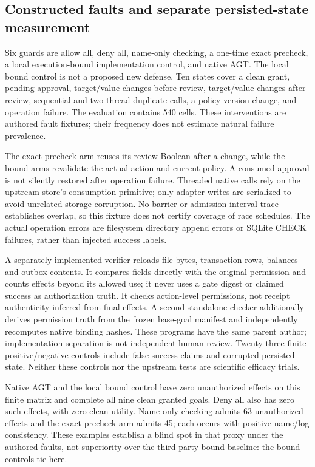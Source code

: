 \subsection{Constructed faults and separate persisted-state measurement}
Six guards are allow all, deny all, name-only checking, a one-time exact precheck,
a local execution-bound implementation control, and native AGT. The local bound
control is not a proposed new defense. Ten states cover a clean grant, pending
approval, target/value changes before review, target/value changes after review,
sequential and two-thread duplicate calls, a policy-version change, and operation
failure. The evaluation contains 540 cells. These interventions are authored fault
fixtures; their frequency does not estimate natural failure prevalence.

The exact-precheck arm reuses its review Boolean after a change, while the bound
arms revalidate the actual action and current policy. A consumed approval is not
silently restored after operation failure. Threaded native calls rely on the
upstream store's consumption primitive; only adapter writes are serialized to avoid
unrelated storage corruption. No barrier or admission-interval trace establishes
overlap, so this fixture does not certify coverage of race schedules. The actual operation errors are filesystem directory
append errors or SQLite CHECK failures, rather than injected success labels.

A separately implemented verifier reloads file bytes, transaction rows, balances
and outbox contents. It compares fields directly with the original permission and
counts effects beyond its allowed use; it never uses a gate digest or claimed
success as authorization truth. It checks action-level permissions, not receipt
authenticity inferred from final effects. A second standalone checker additionally
derives permission truth from the frozen base-goal manifest and independently
recomputes native binding hashes. These programs have the same parent author;
implementation separation is not independent human review. Twenty-three finite
positive/negative controls include false success claims and corrupted persisted
state. Neither these controls nor the upstream tests are scientific efficacy trials.


Native AGT and the local bound control have zero unauthorized effects on this finite
matrix and complete all nine clean granted goals. Deny all also has zero such
effects, with zero clean utility. Name-only checking admits 63 unauthorized effects
and the exact-precheck arm admits 45; each occurs with positive name/log consistency.
These examples establish a blind spot in that proxy under the authored faults,
not superiority over the third-party bound baseline: the bound controls tie here.

